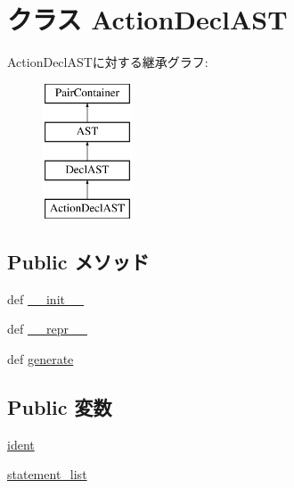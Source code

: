 \hypertarget{classslicc_1_1ast_1_1ActionDeclAST_1_1ActionDeclAST}{
\section{クラス ActionDeclAST}
\label{classslicc_1_1ast_1_1ActionDeclAST_1_1ActionDeclAST}
}
ActionDeclASTに対する継承グラフ:\begin{figure}[H]
\begin{center}
\leavevmode
\includegraphics[height=4cm]{classslicc_1_1ast_1_1ActionDeclAST_1_1ActionDeclAST}
\end{center}
\end{figure}
\subsection*{Public メソッド}
\begin{DoxyCompactItemize}
\item 
def \hyperlink{classslicc_1_1ast_1_1ActionDeclAST_1_1ActionDeclAST_ac775ee34451fdfa742b318538164070e}{\_\-\_\-init\_\-\_\-}
\item 
def \hyperlink{classslicc_1_1ast_1_1ActionDeclAST_1_1ActionDeclAST_ad8b9328939df072e4740cd9a63189744}{\_\-\_\-repr\_\-\_\-}
\item 
def \hyperlink{classslicc_1_1ast_1_1ActionDeclAST_1_1ActionDeclAST_a4555d1cee0dccf3942ea35fe86de2e8e}{generate}
\end{DoxyCompactItemize}
\subsection*{Public 変数}
\begin{DoxyCompactItemize}
\item 
\hyperlink{classslicc_1_1ast_1_1ActionDeclAST_1_1ActionDeclAST_a2fe57e2d3d2cba9a3aeba2f629eaa78b}{ident}
\item 
\hyperlink{classslicc_1_1ast_1_1ActionDeclAST_1_1ActionDeclAST_a53a363e0fba452364cf9d6c768121237}{statement\_\-list}
\end{DoxyCompactItemize}


